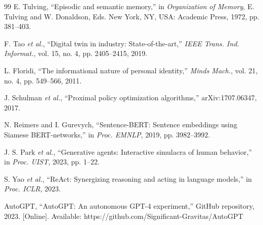 \documentclass[conference]{IEEEtran}
\begin{document}
\begin{thebibliography}{99}
E. Tulving, ``Episodic and semantic memory,'' in \emph{Organization of Memory}, E. Tulving and W. Donaldson, Eds. New York, NY, USA: Academic Press, 1972, pp. 381--403.

F. Tao \emph{et al.}, ``Digital twin in industry: State-of-the-art,'' \emph{IEEE Trans. Ind. Informat.}, vol. 15, no. 4, pp. 2405--2415, 2019.

L. Floridi, ``The informational nature of personal identity,'' \emph{Minds Mach.}, vol. 21, no. 4, pp. 549--566, 2011.

J. Schulman \emph{et al.}, ``Proximal policy optimization algorithms,'' arXiv:1707.06347, 2017.

N. Reimers and I. Gurevych, ``Sentence-BERT: Sentence embeddings using Siamese BERT-networks,'' in \emph{Proc. EMNLP}, 2019, pp. 3982--3992.

J. S. Park \emph{et al.}, ``Generative agents: Interactive simulacra of human behavior,'' in \emph{Proc. UIST}, 2023, pp. 1--22.

S. Yao \emph{et al.}, ``ReAct: Synergizing reasoning and acting in language models,'' in \emph{Proc. ICLR}, 2023.

AutoGPT, ``AutoGPT: An autonomous GPT-4 experiment,'' GitHub repository, 2023. [Online]. Available: https://github.com/Significant-Gravitas/AutoGPT



\end{thebibliography}
\end{document}
